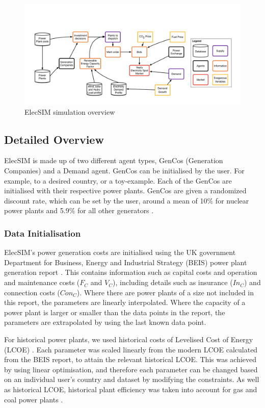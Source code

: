 \begin{figure}
	\centering
	\includegraphics[width=0.97\linewidth]{figures/low_level_system}
	\caption{ElecSIM simulation overview}
	\label{fig:lowlevelsystem}
\end{figure}


\subsection{Detailed Overview}

ElecSIM is made up of two different agent types, GenCos (Generation Companies) and a Demand agent. GenCos can be initialised by the user. For example, to a desired country, or a toy-example. Each of the GenCos are initialised with their respective power plants. GenCos are given a randomized discount rate, which can be set by the user, around a mean of 10\% for nuclear power plants \cite{Paper2012} and 5.9\% for all other generators \cite{KPMG2017}.





\subsubsection{Data Initialisation}ElecSIM's power generation costs are initialised using the UK government Department for Business, Energy and Industrial Strategy (BEIS) power plant generation report \cite{Department2016}. This contains information such as capital costs and operation and maintenance costs ($F_C$ and $V_C$), including details such as insurance ($In_C$) and connection costs ($Con_C$). Where there are power plants of a size not included in this report, the parameters are linearly interpolated. Where the capacity of a power plant is larger or smaller than the data points in the report, the parameters are extrapolated by using the last known data point.

For historical power plants, we used historical costs of Levelised Cost of Energy (LCOE) \cite{Dale2013}. Each parameter was scaled linearly from the modern LCOE calculated from the BEIS report, to attain the relevant historical LCOE. This was achieved by using linear optimisation, and therefore each parameter can be changed based on an individual user's country and dataset by modifying the constraints. As well as historical LCOE, historical plant efficiency was taken into account for gas and coal power plants \cite{EIA2013}.

